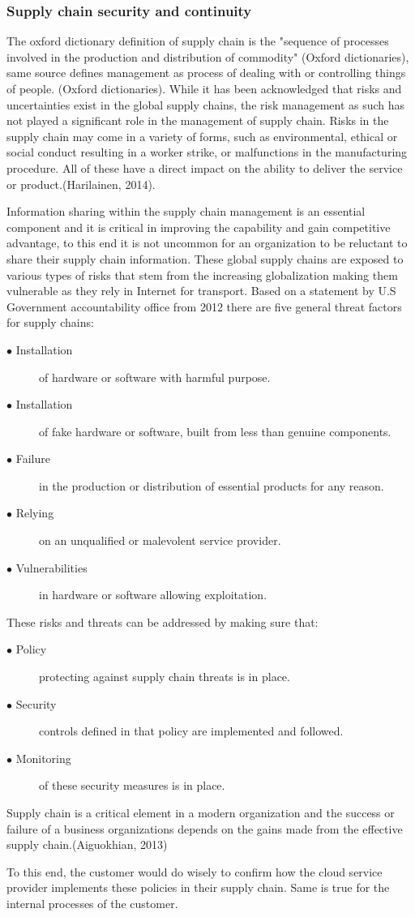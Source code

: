 \documentclass{article}
\begin{document}
\subsubsection{Supply chain security and continuity}
The oxford dictionary definition of supply chain is the "sequence of processes involved in the production and distribution of commodity" (Oxford dictionaries), same source defines management as process of dealing with or controlling things of people. (Oxford dictionaries). 
While it has been acknowledged that risks and uncertainties exist in the global supply chains, the risk management as such has not played a significant role in the management of supply chain. Risks in the supply chain may come in a variety of forms, such as environmental, ethical or social conduct resulting in a worker strike, or malfunctions in the manufacturing procedure. All of these have a direct impact on the ability to deliver the service or product.(Harilainen, 2014).
\par
Information sharing within the supply chain management is an essential component and it is critical in improving the capability and gain competitive advantage, to this end it is not uncommon for an organization to be reluctant to share their supply chain information. These global supply chains are exposed to various types of risks that stem from the increasing globalization making them vulnerable as they rely in Internet for transport. Based on a statement by U.S Government accountability office from 2012 there are five general threat factors for supply chains:
\begin{description}
	\item[$\bullet$ Installation] of hardware or software with harmful purpose.
	\item[$\bullet$ Installation] of fake hardware or software, built from less than genuine components.
	\item[$\bullet$ Failure] in the production or distribution of essential products for any reason.
	\item[$\bullet$ Relying] on an unqualified or malevolent service provider.
	\item[$\bullet$ Vulnerabilities] in hardware or software allowing exploitation.
\end{description}
These risks and threats can be addressed by making sure that:
\begin{description}
	\item[$\bullet$ Policy] protecting against supply chain threats is in place.
	\item[$\bullet$ Security] controls defined in that policy are implemented and followed.
	\item[$\bullet$ Monitoring] of these security measures is in place.
\end{description}
Supply chain is a critical element in a modern organization and the success or failure of a business organizations depends on the gains made from the effective supply chain.(Aiguokhian, 2013)
\par
To this end, the customer would do wisely to confirm how the cloud service provider implements these policies in their supply chain. Same is true for the internal processes of the customer. 
\end{document}
